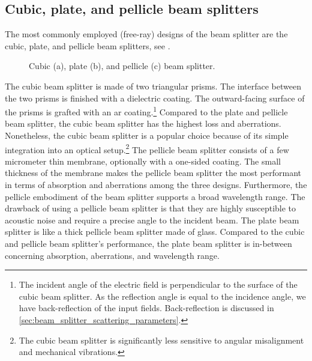 \subsection{Cubic, plate, and pellicle beam splitters}

The most commonly employed (free-ray) designs of the beam splitter are the cubic, plate, and pellicle beam splitters, see .
\begin{figure}[htb]
    \centering
    
    \caption{Cubic (a), plate (b), and pellicle (c) beam splitter.}\label{fig:beam_splitter_types}
\end{figure}
The cubic beam splitter is made of two triangular prisms. The interface between the two prisms is finished with a dielectric coating.
The outward-facing surface of the prisms is grafted with an \gls{ar} coating.\footnote{The incident angle of the electric field is perpendicular to the surface of the cubic beam splitter. As the reflection angle is equal to the incidence angle, we have back-reflection of the input fields. Back-reflection is discussed in \cref{sec:beam_splitter_scattering_parameters}.}
Compared to the plate and pellicle beam splitter, the cubic beam splitter has the highest loss and aberrations.
Nonetheless, the cubic beam splitter is a popular choice because of its simple integration into an optical setup.\footnote{The cubic beam splitter is significantly less sensitive to angular misalignment and mechanical vibrations.}
The pellicle beam splitter consists of a few micrometer thin membrane, optionally with a one-sided coating.
The small thickness of the membrane makes the pellicle beam splitter the most performant in terms of absorption and aberrations among the three designs.
Furthermore, the pellicle embodiment of the beam splitter supports a broad wavelength range.
The drawback of using a pellicle beam splitter is that they are highly susceptible to acoustic noise and require a precise angle to the incident beam.
The plate beam splitter is like a thick pellicle beam splitter made of glass.
Compared to the cubic and pellicle beam splitter's performance, the plate beam splitter is in-between concerning absorption, aberrations, and wavelength range.

